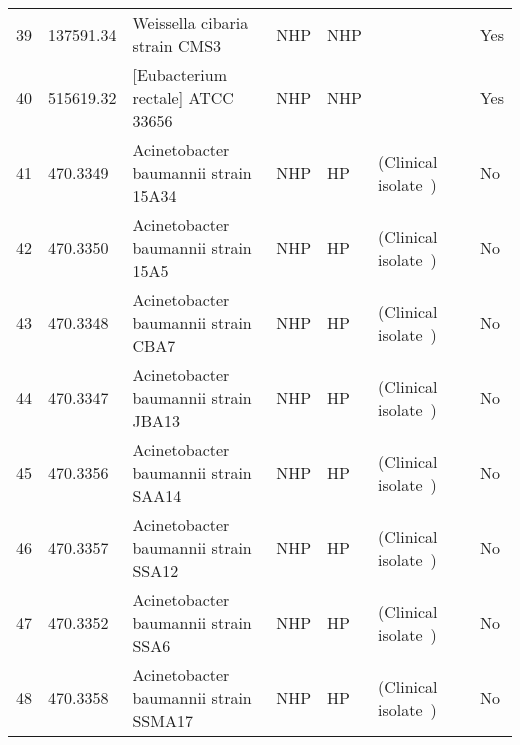 \begin{tabular}{llllllll}
39  &   137591.34 &                                     Weissella cibaria strain CMS3 &           NHP &             NHP &                                  \cite{kang2005coaggregation} &                                  &           Yes \\
40  &   515619.32 &                                  [Eubacterium rectale] ATCC 33656 &           NHP &             NHP &                             \cite{mahowald2009characterizing} &                                  &           Yes \\
41  &    470.3349 &                              Acinetobacter baumannii strain 15A34 &           NHP &              HP &                         (Clinical isolate~\cite{yoon2017bla}) &                                  &            No \\
42  &    470.3350 &                               Acinetobacter baumannii strain 15A5 &           NHP &              HP &                         (Clinical isolate~\cite{yoon2017bla}) &                                  &            No \\
43  &    470.3348 &                               Acinetobacter baumannii strain CBA7 &           NHP &              HP &                         (Clinical isolate~\cite{yoon2017bla}) &                                  &            No \\
44  &    470.3347 &                              Acinetobacter baumannii strain JBA13 &           NHP &              HP &                         (Clinical isolate~\cite{yoon2017bla}) &                                  &            No \\
45  &    470.3356 &                              Acinetobacter baumannii strain SAA14 &           NHP &              HP &                         (Clinical isolate~\cite{yoon2017bla}) &                                  &            No \\
46  &    470.3357 &                              Acinetobacter baumannii strain SSA12 &           NHP &              HP &                         (Clinical isolate~\cite{yoon2017bla}) &                                  &            No \\
47  &    470.3352 &                               Acinetobacter baumannii strain SSA6 &           NHP &              HP &                         (Clinical isolate~\cite{yoon2017bla}) &                                  &            No \\
48  &    470.3358 &                             Acinetobacter baumannii strain SSMA17 &           NHP &              HP &                         (Clinical isolate~\cite{yoon2017bla}) &                                  &            No \\

\end{tabular}
